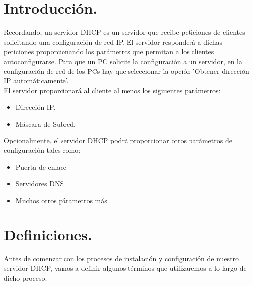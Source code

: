 \section{Introducción.}
Recordando, un servidor DHCP es un servidor que recibe peticiones de clientes solicitando una configuración de red IP. El servidor responderá a dichas peticiones proporcionando los parámetros que permitan a los clientes autoconfigurarse. Para que un PC solicite la configuración a un servidor, en la configuración de red de los PCs hay que seleccionar la opción 'Obtener dirección IP automáticamente'.\\

El servidor proporcionará al cliente al menos los siguientes parámetros: 
	
	\begin{itemize}
		\item Dirección IP.
		\item Máscara de Subred.
	\end{itemize}
	
Opcionalmente, el servidor DHCP podrá proporcionar otros parámetros de configuración tales como:


	\begin{itemize}
		\item Puerta de enlace 
		\item Servidores DNS
		\item Muchos otros párametros más
	\end{itemize}
	
\section{Definiciones.}	

Antes de comenzar con los procesos de instalación y configuración de nuestro servidor DHCP, vamos a definir algunos términos que utilizaremos a lo largo de dicho proceso. \\
\\


